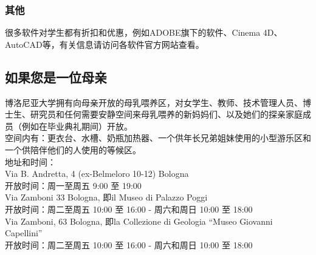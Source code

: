\subsubsection{其他}
很多软件对学生都有折扣和优惠，例如ADOBE旗下的软件、Cinema 4D、AutoCAD等，有关信息请访问各软件官方网站查看。

\subsection{如果您是一位母亲}
博洛尼亚大学拥有向母亲开放的母乳喂养区，对女学生、教师、技术管理人员、博士生、研究员和任何需要安静空间来母乳喂养的新妈妈们、以及她们的探亲家庭成员（例如在毕业典礼期间）开放。\\
空间内有：更衣台、水槽、奶瓶加热器、一个供年长兄弟姐妹使用的小型游乐区和一个供陪伴他们的人使用的等候区。\\
地址和时间：\\
Via B. Andretta, 4 (ex-Belmeloro 10-12) Bologna\\
开放时间：周一至周五 9:00 至 19:00\\
Via Zamboni 33 Bologna, 即il Museo di Palazzo Poggi\\
开放时间：周二至周五 10:00 至 16:00 - 周六和周日 10:00 至 18:00\\
Via Zamboni, 63 Bologna, 即la Collezione di Geologia “Museo Giovanni Capellini”\\
开放时间：周二至周五 10:00 至 16:00 - 周六和周日 10:00 至 18:00\\








